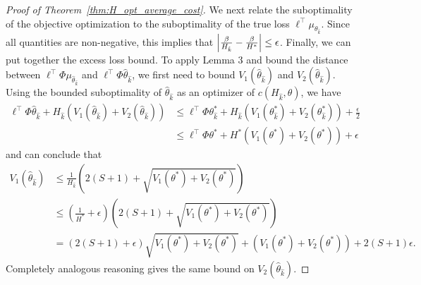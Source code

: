 \documentclass[11pt]{article}
\begin{document}
\begin{proof}[Proof of Theorem~\ref{thm:H_opt_average_cost}]
We next relate the suboptimality of the objective optimization to the suboptimality of the true loss $\ell^\top \mu_{\theta_{\hat k}}$. Since all quantities are non-negative, this implies that $\left\vert\frac{\beta}{H_{\hat k}} - \frac{\beta}{H^*}\right\vert\leq\epsilon$. Finally, we can put together the excess loss bound. To apply Lemma 3 and bound the distance between
$\ell^\top\Phi\mu_{\widehat\theta_{\hat k}}$ and
$\ell^\top\Phi\widehat\theta_{\hat k}$, we first need to bound $V_1(\widehat\theta_{\hat k})$ and $V_2(\widehat\theta_{\hat k})$. Using the bounded suboptimality of $\widehat\theta_{\hat k}$ as an optimizer of $c(H_{\hat k},\theta)$, we have
\begin{align*}
  \ell^\top\Phi\widehat\theta_{\hat k}
  + H_{\hat k}\left(V_1(\widehat\theta_{\hat k}) + V_2(\widehat\theta_{\hat k})\right)
  &\leq
  \ell^\top\Phi\theta^*_{\hat k}
  + H_{\hat k}\left(V_1(\theta^*_{\hat k}) + V_2(\theta^*_{\hat k})\right)+ \frac{\epsilon}{2}\\
  & \leq
  \ell^\top\Phi\theta^*
  + H^*\left(V_1(\theta^*) + V_2(\theta^*)\right)+ \epsilon
\end{align*}
and can conclude that
\begin{align*}
  V_1(\widehat\theta_{\hat k})
  &\leq
    \frac{1}{H_{\hat k}}\left(
    2(S+1) + \sqrt{V_1(\theta^*) + V_2(\theta^*)}\right)\\
  &\leq
    \left(\frac{1}{H^*}+\epsilon\right)
    \left(
    2(S+1) + \sqrt{V_1(\theta^*) + V_2(\theta^*)}
    \right)\\
  &=
     (2(S+1)+\epsilon)  \sqrt{V_1(\theta^*) + V_2(\theta^*)}
    + (V_1(\theta^*) + V_2(\theta^*))
    + 2(S+1)\epsilon.
\end{align*}
Completely analogous reasoning gives the same bound on  $V_2(\widehat\theta_{\hat k})$.


\end{proof}
\end{document}
